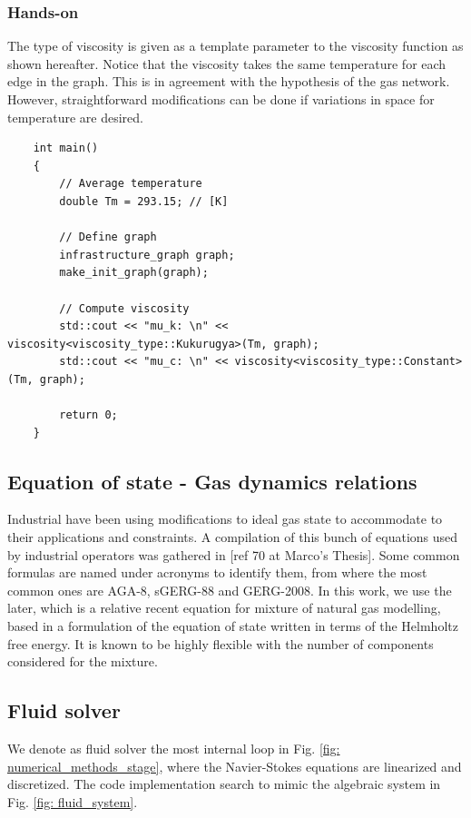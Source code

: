 \subsubsection{Hands-on}
The type of viscosity is given as a template parameter to the viscosity function as shown hereafter. Notice that the viscosity takes the same temperature for each edge in the graph. This is in agreement with the  hypothesis of the gas network. However, straightforward modifications can be done if variations in space for temperature are desired.  
\begin{verbatim}
    int main()
    {
        // Average temperature
        double Tm = 293.15; // [K]  

        // Define graph
        infrastructure_graph graph;
        make_init_graph(graph);

        // Compute viscosity
        std::cout << "mu_k: \n" << viscosity<viscosity_type::Kukurugya>(Tm, graph);
        std::cout << "mu_c: \n" << viscosity<viscosity_type::Constant>(Tm, graph);

        return 0;
    }
\end{verbatim}

\subsection{Equation of state - Gas dynamics relations}
Industrial have been using modifications to ideal gas state to accommodate to their applications and constraints. A compilation of this bunch of equations used by industrial operators was gathered in [ref 70 at Marco's Thesis]. Some common formulas are  named under acronyms to identify them, from where the most common ones are AGA-8,  sGERG-88 and GERG-2008. In this work, we use the later, which is a relative recent equation for mixture of natural gas modelling, based in a formulation of the equation of state written in terms of the Helmholtz free energy. It is known to be highly flexible with the number of components considered for the mixture. 


\subsection{Fluid solver}   
We denote as fluid solver the most internal loop in Fig. \ref{fig: numerical_methods_stage}, where the Navier-Stokes equations are linearized and discretized.  The code  implementation search to mimic the algebraic system in Fig. \ref{fig: fluid_system}. 

